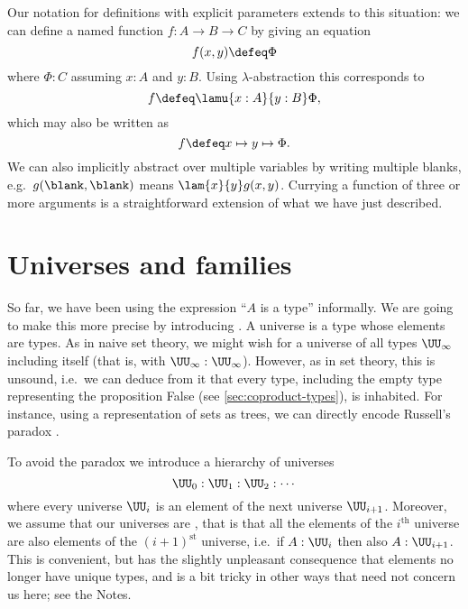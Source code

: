 Our notation for definitions with explicit parameters extends to
this situation: we can define a named function $f : A \to B \to C$ by
giving an equation
\[ f(x,y) \defeq \Phi\]
where $\Phi:C$ assuming $x:A$ and $y:B$. Using $\lambda$-abstraction this
corresponds to
\[ f \defeq \lamu{x:A}{y:B} \Phi, \]
which may also be written as 
\[ f \defeq x \mapsto y \mapsto \Phi. \] 
We can also implicitly abstract over multiple variables by writing multiple blanks, e.g.\ $g(\blank,\blank)$ means $\lam{x}{y} g(x,y)$.
Currying a function of three or more arguments is a straightforward extension of what we have just described.
 
%
%


\section{Universes and families}
\label{sec:universes}

So far, we have been using the expression ``$A$ is a type'' informally. We
are going to make this more precise by introducing .
%
%
A universe is a type whose elements are types. As in naive set theory,
we might wish for a universe of all types $\UU_\infty$ including itself
(that is, with $\UU_\infty : \UU_\infty$).
However, as in set
theory, this is unsound, i.e.\ we can deduce from it that every type,
including the empty type representing the proposition False (see \cref{sec:coproduct-types}), is inhabited.
For instance, using a
representation of sets as trees, we can directly encode Russell's
paradox \cite{coquand:paradox}.

To avoid the paradox we introduce a hierarchy of universes
%
\[ \UU_0 : \UU_1 : \UU_2 : \cdots \]
where every universe $\UU_i$ is an element of the next universe
$\UU_{i+1}$. Moreover, we assume that our universes are
,
%
%
that is that all the elements of the $i^{\mathrm{th}}$
universe are also elements of the $(i+1)^{\mathrm{st}}$ universe, i.e.\ if
$A:\UU_i$ then also $A:\UU_{i+1}$.
This is convenient, but has the slightly unpleasant consequence that elements no longer have unique types, and is a bit tricky in other ways that need not concern us here; see the Notes.

